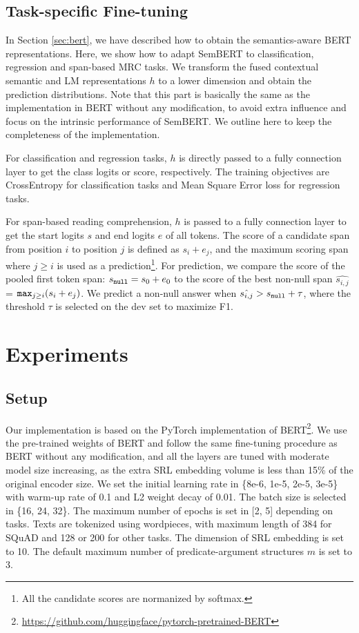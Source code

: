 \documentclass[letterpaper]{article} \usepackage{aaai20}  \usepackage{times}  \usepackage{helvet} \usepackage{courier}  \usepackage[hyphens]{url}  \usepackage{graphicx} \urlstyle{rm} \def\UrlFont{\rm}  \usepackage{graphicx}  \frenchspacing  \usepackage{amssymb}
\begin{document}
\subsection{Task-specific Fine-tuning} \label{task-specific}
In Section \ref{sec:bert}, we have described how to obtain the semantics-aware BERT representations. Here, we show how to adapt SemBERT to classification, regression and span-based MRC tasks. We transform the fused contextual semantic and LM representations $h$ to a lower dimension and obtain the prediction distributions. Note that this part is basically the same as the implementation in BERT without any modification, to avoid extra influence and focus on the intrinsic performance of SemBERT. We outline here to keep the completeness of the implementation.

For classification and regression tasks, $h$ is directly passed to a fully connection layer to get the class logits or score, respectively. The training objectives are CrossEntropy for classification tasks and Mean Square Error loss for regression tasks. 

For span-based reading comprehension, $h$ is passed to a fully connection layer to get the start logits $s$ and end logits $e$ of all tokens. The score of a candidate span from position $i$ to position $j$ is defined as  $s_i + e_j$, and the maximum scoring span where $j \geq i$ is used as a prediction\footnote{All the candidate scores are normanized by softmax.}. For prediction, we compare
the score of the pooled first token span: $s_{\tt null} = s_0 + e_0$ to the score of the best non-null span $\hat{s_{i,j}}$ =  $ {\tt max}_{j \geq i} (s_i + e_j)$. We predict a non-null answer when  $\hat{s_{i,j}} > s_{\tt null} + \tau $, where the threshold $\tau$ is selected on the dev set to maximize F1.

\section{Experiments}
\subsection{Setup}
Our implementation is based on the PyTorch implementation of BERT\footnote{\url{https://github.com/huggingface/pytorch-pretrained-BERT}}. We use the pre-trained weights of BERT and follow the same fine-tuning procedure as BERT without any modification, and all the layers are tuned with moderate model size increasing, as the extra SRL embedding volume is less than 15\% of the original encoder size. We set the initial learning rate in \{8e-6, 1e-5, 2e-5, 3e-5\} with warm-up rate of 0.1 and L2 weight decay of 0.01. The batch size is selected in \{16, 24, 32\}. The maximum number of epochs is set in [2, 5] depending on tasks. Texts are tokenized using wordpieces, with maximum length of 384 for SQuAD and 128 or 200 for other tasks. The dimension of SRL embedding is set to 10. The default maximum number of predicate-argument structures $m$ is set to 3.
\end{document}
